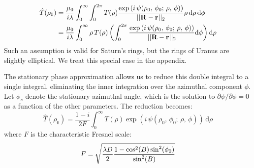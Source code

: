 \documentclass{article}
\begin{document}
        \begin{subequations}
            \begin{align}
                \hat{T}(\rho_{0})
                &=\frac{\mu_{0}}{i\lambda}\int_{0}^{\infty}\int_{0}^{2\pi}
                    T(\rho)
                    \frac{%
                        \exp\left(
                            i\,\psi(\rho_{0},\,\phi_{0};\,\rho,\,\phi)
                        \right)
                    }{%
                        ||\mathbf{R}-\mathbf{r}||_{2}
                    }
                    \rho\,\textrm{d}\rho\,\textrm{d}\phi\\
                &=\frac{\mu_{0}}{i\lambda}\int_{0}^{\infty}
                    \rho\,T(\rho)\left(
                        \int_{0}^{2\pi}
                        \frac{%
                            \exp\left(
                                i\,\psi(\rho_{0},\,\phi_{0};\,\rho,\,\phi)
                            \right)
                        }{%
                            ||\mathbf{R}-\mathbf{r}||_{2}
                        }
                        \textrm{d}\phi
                    \right)
                    \textrm{d}\rho
                \end{align}
        \end{subequations}
        Such an assumption is valid for Saturn's rings, but the rings of
        Uranus are slightly elliptical.
        We treat this special case in the appendix.
        \par\hfill\par
        The stationary phase approximation allows us to reduce this double
        integral to a single integral, eliminating the inner integration over
        the azimuthal component $\phi$. Let $\phi_{s}$ denote the stationary
        azimuthal angle, which is the solution to
        $\partial\psi/\partial\phi=0$ as a function of the other
        parameters. The reduction becomes:
        \begin{equation}
            \label{eqn:single_variable_huygens}
            \hat{T}(\rho_{0})
            =\frac{1-i}{2F}\int_{0}^{\infty}
                T(\rho)\exp\left(
                    i\,\psi(\rho_{0},\,\phi_{0};\,\rho,\,\phi)
                \right)
                \,\textrm{d}\rho
        \end{equation}
        where $F$ is the characteristic Fresnel scale:
        \begin{equation}
            \label{eqn:fresnel_scale}
            F=
            \sqrt{%
                \frac{\lambda{D}}{2}%
                \frac{1-\cos^{2}(B)\sin^{2}(\phi_{0})}{\sin^{2}(B)}%
            }
        \end{equation}
\end{document}
